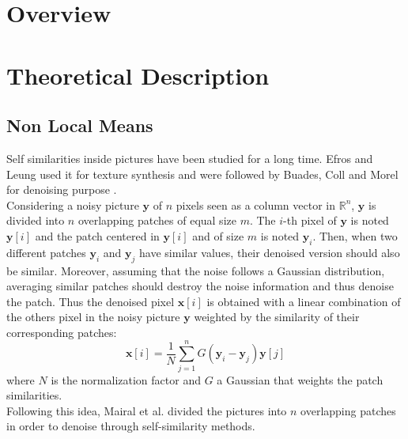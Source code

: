 \documentclass{ipol}
\newcommand{\psize}{m}
\newcommand{\denoi}{\textbf{x}}
\newcommand{\noi}{\textbf{y}}
\newcommand{\Rn}{\mathbb{R}^n}
\begin{document}
\begin{abstract}

\end{abstract} 

\section{Overview}


\section{Theoretical Description}

\subsection{ Non Local Means }

Self similarities inside pictures have been studied for a long time. Efros and Leung used it for texture synthesis \cite{Patch01} and were followed by Buades, Coll and Morel for denoising purpose \cite{Patch02}.\\
Considering a noisy picture $\noi$ of $n$ pixels seen as a column vector in $\Rn$, $\noi$ is divided into $n$ overlapping patches of equal size $\psize$. The $i$-th pixel of $\noi$ is noted $\noi[i]$ and the patch centered in $\noi[i]$ and of size $\psize$ is noted $\noi_i$. Then, when two different patches $\noi_i$ and $\noi_j$ have similar values, their denoised version should also be similar. Moreover, assuming that the noise follows a Gaussian distribution, averaging similar patches should destroy the noise information and thus denoise the patch. Thus the denoised pixel $\denoi[i]$ is obtained with a linear combination of the others pixel in the noisy picture $\noi$ weighted by the similarity of their corresponding patches:
\begin{equation}
	\denoi[i] = \frac{1}{N} \sum_{j=1}^n G(\noi_i - \noi_j) \noi[j]
\end{equation}
where $N$ is the normalization factor and $G$ a Gaussian that weights the patch similarities.\\ 
Following this idea, Mairal et al. \cite{LSSC} divided the pictures into $n$ overlapping patches in order to denoise through self-similarity methods.
\end{document}
